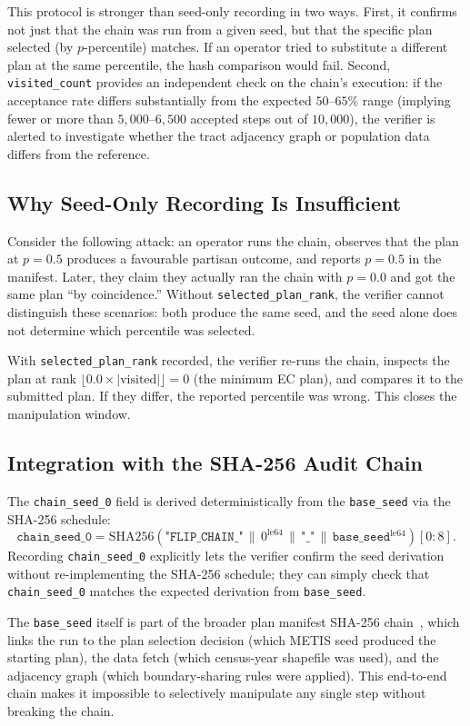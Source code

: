 This protocol is stronger than seed-only recording in two ways.
First, it confirms not just that the chain was run from a given seed, but
that the specific plan selected (by $p$-percentile) matches.
If an operator tried to substitute a different plan at the same percentile,
the hash comparison would fail.
Second, \texttt{visited\_count} provides an independent check on the chain's
execution: if the acceptance rate differs substantially from the expected
$50$--$65\%$ range (implying fewer or more than $5{,}000$--$6{,}500$ accepted
steps out of $10{,}000$), the verifier is alerted to investigate whether
the tract adjacency graph or population data differs from the reference.

\subsection{Why Seed-Only Recording Is Insufficient}

Consider the following attack: an operator runs the \flip{} chain, observes
that the plan at $p = 0.5$ produces a favourable partisan outcome, and
reports $p = 0.5$ in the manifest.
Later, they claim they actually ran the chain with $p = 0.0$ and got the same
plan ``by coincidence.''
Without \texttt{selected\_plan\_rank}, the verifier cannot distinguish these
scenarios: both produce the same seed, and the seed alone does not determine
which percentile was selected.

With \texttt{selected\_plan\_rank} recorded, the verifier re-runs the chain,
inspects the plan at rank $\lfloor 0.0 \times |\mathrm{visited}| \rfloor = 0$
(the minimum EC plan), and compares it to the submitted plan.
If they differ, the reported percentile was wrong.
This closes the manipulation window.

\subsection{Integration with the SHA-256 Audit Chain}

The \texttt{chain\_seed\_0} field is derived deterministically from the
\texttt{base\_seed} via the SHA-256 schedule:
\[
  \texttt{chain\_seed\_0} = \mathrm{SHA256}\!\left(
    \texttt{"FLIP\_CHAIN\_"} \,\|\, 0^{\mathrm{le64}} \,\|\,
    \texttt{"\_"} \,\|\, \texttt{base\_seed}^{\mathrm{le64}}
  \right)[0{:}8].
\]
Recording \texttt{chain\_seed\_0} explicitly lets the verifier confirm the
seed derivation without re-implementing the SHA-256 schedule; they can simply
check that \texttt{chain\_seed\_0} matches the expected derivation from
\texttt{base\_seed}.

The \texttt{base\_seed} itself is part of the broader plan manifest SHA-256
chain~\citep{b11paper}, which links the \flip{} run to the plan selection
decision (which METIS seed produced the starting plan), the data fetch
(which census-year shapefile was used), and the adjacency graph (which
boundary-sharing rules were applied).
This end-to-end chain makes it impossible to selectively manipulate any single
step without breaking the chain.
